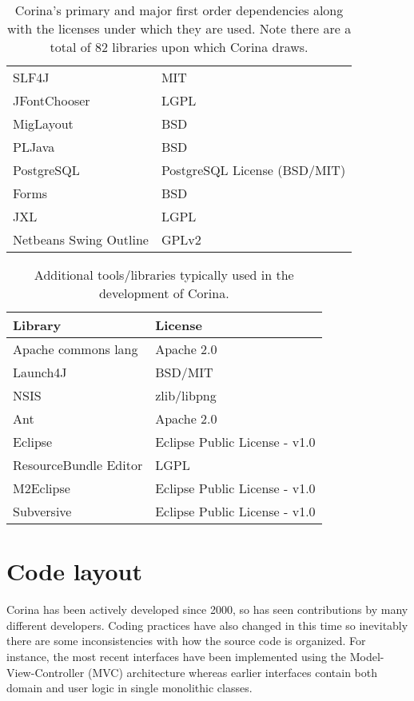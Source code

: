 \begin{table*}[htbp]
\begin{tabular*}{0.6\textwidth}{ll}
SLF4J & MIT\\
JFontChooser & LGPL\\
MigLayout & BSD\\
PLJava & BSD\\
PostgreSQL & PostgreSQL License (BSD/MIT)\\
Forms & BSD\\
JXL & LGPL\\
Netbeans Swing Outline & GPLv2\\
\bottomrule
\end{tabular*}
\captionsetup{width=0.6\textwidth}
\caption{Corina's primary and major first order dependencies along with the licenses under which they are used.  Note there are a total of 82 libraries upon which Corina draws.}
\label{tbl:desktopDependencies}
\end{table*}


\begin{table*}[htbp]
\centering
\label{tbl:developDependencies}
\begin{tabular*}{0.6\textwidth}{ll}
\toprule
Library & License \\
\midrule
Apache commons lang & Apache 2.0 \\
Launch4J & BSD/MIT \\
NSIS & zlib/libpng \\
Ant & Apache 2.0 \\
Eclipse & Eclipse Public License - v1.0\\
ResourceBundle Editor & LGPL \\
M2Eclipse & Eclipse Public License - v1.0\\
Subversive & Eclipse Public License - v1.0\\
\bottomrule
\end{tabular*}
\captionsetup{width=0.6\textwidth}
\caption{Additional tools/libraries typically used in the development of Corina.}
\end{table*}

\section{Code layout}
Corina has been actively developed since 2000, so has seen contributions by many different developers.  Coding practices have also changed in this time so inevitably there are some inconsistencies with how the source code is organized.  For instance, the most recent interfaces have been implemented using the Model-View-Controller (MVC) architecture whereas earlier interfaces contain both domain and user logic in single monolithic classes.  

